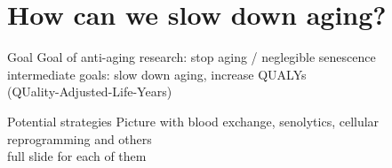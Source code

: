 \section{How can we slow down aging?}


\begin{frame}[c]{Goal}
    Goal of anti-aging research: stop aging / neglegible senescence \\
    intermediate goals: slow down aging, increase QUALYs \\
    (QUality-Adjusted-Life-Years)
\end{frame}


\begin{frame}[c]{Potential strategies}
    Picture with blood exchange, senolytics, cellular reprogramming and others \\
    full slide for each of them
\end{frame}


